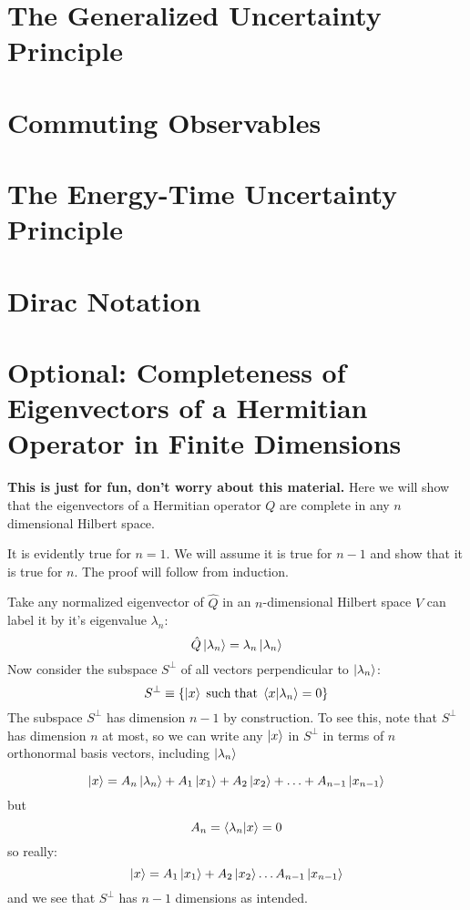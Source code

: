 \documentclass[12pt]{book}
\begin{document}
\section{The Generalized Uncertainty Principle}

\section{Commuting Observables}

\section{The Energy-Time Uncertainty Principle}

\section{Dirac Notation}

\section{Optional:  Completeness of Eigenvectors of a Hermitian Operator in Finite Dimensions}

{\bf This is just for fun, don't worry about this material.}  Here we
will show that the eigenvectors of a Hermitian operator $Q$ are
complete in any $n$ dimensional Hilbert space.

It is evidently true for $n=1$.  We will assume it is true for $n-1$ and show that it is true for $n$.  The proof will follow from induction.

Take any normalized eigenvector of $\hat{Q}$ in an $n$-dimensional Hilbert space $V$ can label it by it's eigenvalue $\lambda_n$:
$$\hat{Q}\ket{\lambda_n} = \lambda_n \ket{\lambda_n}$$
Now consider the subspace $S^\perp$ of all vectors perpendicular to $\ket{\lambda_n}$:
$$S^\perp \equiv \{ \ket{x} \; {\rm such \; that} \; \braket{x|\lambda_n}=0 \}$$
The subspace $S^\perp$ has dimension $n-1$ by construction.  To see
this, note that $S^\perp$ has dimension $n$ at most, so we can write
any $\ket{x}$ in $S^\perp$ in terms of $n$ orthonormal basis vectors, including $\ket{\lambda_n}$

$$\ket{x} = A_n \ket{\lambda_n} + A_1 \ket{x_1} + A_2 \ket{x_2} + \ldots  + A_{n-1} \ket{x_{n-1}}$$
but
$$A_n = \braket{\lambda_n|x} = 0$$
so really:
$$\ket{x} = A_1 \ket{x_1} + A_2 \ket{x_2} \ldots A_{n-1} \ket{x_{n-1}}$$
and we see that $S^\perp$ has $n-1$ dimensions as intended.
\end{document}
